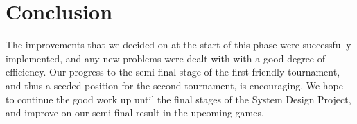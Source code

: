 \documentclass[conference,12pt]{IEEEtran}
\begin{document}
\section{Conclusion}
The improvements that we decided on at the start of this phase were successfully implemented, and any new problems were dealt with with a good degree of efficiency. Our progress to the semi-final stage of the first friendly tournament, and thus a seeded position for the second tournament, is encouraging. We hope to continue the good work up until the final stages of the System Design Project, and improve on our semi-final result in the upcoming games.
\pagebreak
\end{document}
